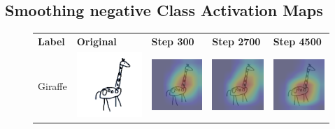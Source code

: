 \subsection{Smoothing negative Class Activation Maps}
\begin{figure}[t]
    \centering
    \begin{tabularx}{\textwidth}{lYYYY}
       \textbf{Label}  & \textbf{Original} & \textbf{Step 300} & \textbf{Step 2700} & \textbf{Step 4500} \\[0.2cm]
        Giraffe & \includegraphics[width=\imagequadsizecams]{Figures/Chapter4/img66.png} &  \includegraphics[width=\imagequadsizecams]{Figures/Chapter4/giraffe1_step_300_cam.png} & \includegraphics[width=\imagequadsizecams]{Figures/Chapter4/giraffe1_step_2700_cam.png} &
        \includegraphics[width=\imagequadsizecams]{Figures/Chapter4/giraffe1_step_4500_cam.png} \\

\end{tabularx}
\end{figure}
